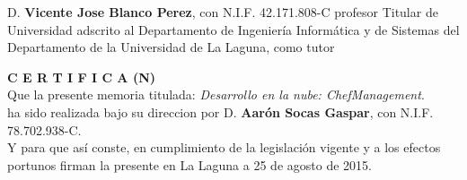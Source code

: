 \documentclass[a4paper,14pt]{book}
\begin{document}
	
	D. \textbf{Vicente Jose Blanco Perez}, con N.I.F. 42.171.808-C profesor Titular	de Universidad adscrito al Departamento de Ingeniería Informática y de Sistemas	del Departamento de la Universidad de La Laguna, como tutor \\
	\vspace*{0.6in}

	\textbf{C E R T I F I C A (N)} \\

	\vspace*{0.1in}
	Que la presente memoria titulada: \emph{Desarrollo en la nube: ChefManagement}. \\

	\vspace*{0.1in}
	ha sido realizada bajo su direccion por D. \textbf{Aarón Socas Gaspar},	con N.I.F. 78.702.938-C. \\

	\vspace*{0.1in}
	Y para que así conste, en cumplimiento de la legislación vigente y a los efectos portunos firman la presente en La Laguna a 25 de agosto de 2015. 
\end{document}

